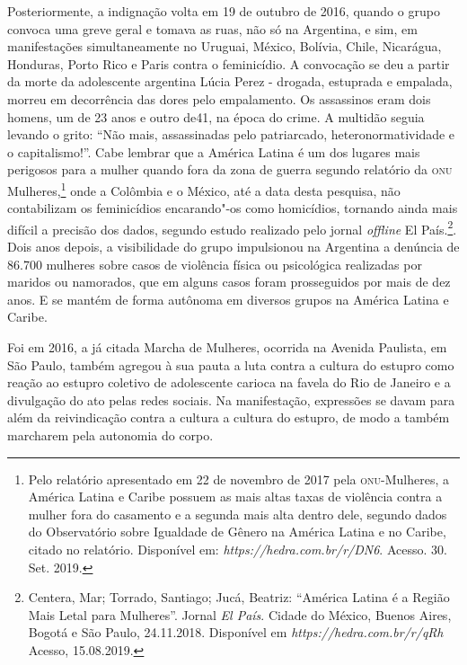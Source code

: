 Posteriormente, a indignação volta em 19 de outubro de 2016, quando o
grupo convoca uma greve geral e tomava as ruas, não só na Argentina, e
sim, em manifestações simultaneamente no Uruguai, México, Bolívia,
Chile, Nicarágua, Honduras, Porto Rico e Paris contra o feminicídio. A
convocação se deu a partir da morte da adolescente argentina Lúcia Perez
- drogada, estuprada e empalada, morreu em decorrência das dores pelo
empalamento. Os assassinos eram dois homens, um de 23 anos e outro de41,
na época do crime. A multidão seguia levando o grito: ``Não mais,
assassinadas pelo patriarcado, heteronormatividade e o capitalismo!''.
Cabe lembrar que a América Latina é um dos lugares mais perigosos para a
mulher quando fora da zona de guerra segundo relatório da \textsc{onu}
Mulheres,\footnote{Pelo relatório apresentado em 22 de novembro de 2017
  pela \textsc{onu}-Mulheres, a América Latina e Caribe possuem as mais altas
  taxas de violência contra a mulher fora do casamento e a segunda mais
  alta dentro dele, segundo dados do Observatório sobre Igualdade de
  Gênero na América Latina e no Caribe, citado no relatório. Disponível
  em:
  \emph{https://hedra.com.br/r/DN6}.
  Acesso. 30. Set. 2019.} onde a Colômbia e o México, até a data desta
pesquisa, não contabilizam os feminicídios encarando"-os como homicídios,
tornando ainda mais difícil a precisão dos dados, segundo estudo
realizado pelo jornal \emph{offline} El País.\footnote{Centera, Mar; Torrado,
  Santiago; Jucá, Beatriz: ``América Latina é a Região Mais Letal para
  Mulheres''. Jornal \emph{El País}. Cidade do México, Buenos Aires,
  Bogotá e São Paulo, 24.11.2018. Disponível em
  \emph{https://hedra.com.br/r/qRh}
  Acesso, 15.08.2019.}. Dois anos depois, a visibilidade do grupo
impulsionou na Argentina a denúncia de 86.700 mulheres sobre casos de
violência física ou psicológica realizadas por maridos ou namorados, que
em alguns casos foram prosseguidos por mais de dez anos. E se mantém de
forma autônoma em diversos grupos na América Latina e Caribe.

Foi em 2016, a já citada Marcha de Mulheres, ocorrida na Avenida
Paulista, em São Paulo, também agregou à sua pauta a luta contra a
cultura do estupro como reação ao estupro coletivo de adolescente
carioca na favela do Rio de Janeiro e a divulgação do ato pelas redes
sociais. Na manifestação, expressões se davam para além da reivindicação
contra a cultura a cultura do estupro, de modo a também marcharem pela
autonomia do corpo.

